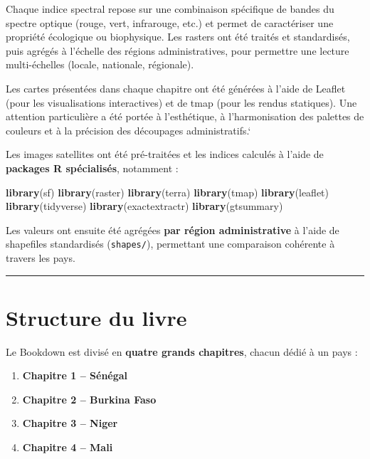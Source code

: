 \documentclass[
]{book}
\newenvironment{Shaded}{\begin{snugshade}}{\end{snugshade}}
\newcommand{\FunctionTok}[1]{\textcolor[rgb]{0.13,0.29,0.53}{\textbf{#1}}}
\newcommand{\NormalTok}[1]{#1}
\providecommand{\tightlist}{%
  \setlength{\itemsep}{0pt}\setlength{\parskip}{0pt}}
\begin{document}
Chaque indice spectral repose sur une combinaison spécifique de bandes du spectre optique (rouge, vert, infrarouge, etc.) et permet de caractériser une propriété écologique ou biophysique. Les rasters ont été traités et standardisés, puis agrégés à l'échelle des régions administratives, pour permettre une lecture multi-échelles (locale, nationale, régionale).

Les cartes présentées dans chaque chapitre ont été générées à l'aide de Leaflet (pour les visualisations interactives) et de tmap (pour les rendus statiques). Une attention particulière a été portée à l'esthétique, à l'harmonisation des palettes de couleurs et à la précision des découpages administratifs.`

Les images satellites ont été pré-traitées et les indices calculés à l'aide de \textbf{packages R spécialisés}, notamment :

\begin{Shaded}
\begin{Highlighting}[]
\FunctionTok{library}\NormalTok{(sf)}
\FunctionTok{library}\NormalTok{(raster)}
\FunctionTok{library}\NormalTok{(terra)}
\FunctionTok{library}\NormalTok{(tmap)}
\FunctionTok{library}\NormalTok{(leaflet)}
\FunctionTok{library}\NormalTok{(tidyverse)}
\FunctionTok{library}\NormalTok{(exactextractr)}
\FunctionTok{library}\NormalTok{(gtsummary)}
\end{Highlighting}
\end{Shaded}

Les valeurs ont ensuite été agrégées \textbf{par région administrative} à l'aide de shapefiles standardisés (\texttt{shapes/}), permettant une comparaison cohérente à travers les pays.

\begin{center}\rule{0.5\linewidth}{0.5pt}\end{center}

\section{Structure du livre}\label{structure-du-livre}

Le Bookdown est divisé en \textbf{quatre grands chapitres}, chacun dédié à un pays :

\begin{enumerate}
\def\labelenumi{\arabic{enumi}.}
\tightlist
\item
  \textbf{Chapitre 1 -- Sénégal}\\
\item
  \textbf{Chapitre 2 -- Burkina Faso}\\
\item
  \textbf{Chapitre 3 -- Niger}\\
\item
  \textbf{Chapitre 4 -- Mali}
\end{enumerate}
\end{document}

